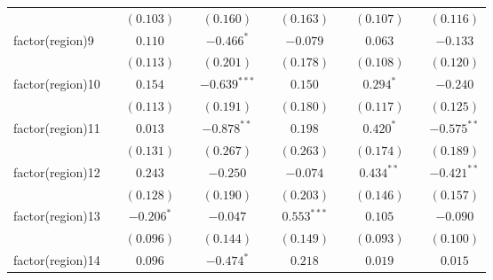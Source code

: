 \begin{tabular}{l c c c c c c c c c c}
                   &                & $(0.103)$      &                & $(0.160)$      &                & $(0.163)$      &                & $(0.107)$      &                & $(0.116)$      \\
factor(region)9    &                & $0.110$        &                & $-0.466^{*}$   &                & $-0.079$       &                & $0.063$        &                & $-0.133$       \\
                   &                & $(0.113)$      &                & $(0.201)$      &                & $(0.178)$      &                & $(0.108)$      &                & $(0.120)$      \\
factor(region)10   &                & $0.154$        &                & $-0.639^{***}$ &                & $0.150$        &                & $0.294^{*}$    &                & $-0.240$       \\
                   &                & $(0.113)$      &                & $(0.191)$      &                & $(0.180)$      &                & $(0.117)$      &                & $(0.125)$      \\
factor(region)11   &                & $0.013$        &                & $-0.878^{**}$  &                & $0.198$        &                & $0.420^{*}$    &                & $-0.575^{**}$  \\
                   &                & $(0.131)$      &                & $(0.267)$      &                & $(0.263)$      &                & $(0.174)$      &                & $(0.189)$      \\
factor(region)12   &                & $0.243$        &                & $-0.250$       &                & $-0.074$       &                & $0.434^{**}$   &                & $-0.421^{**}$  \\
                   &                & $(0.128)$      &                & $(0.190)$      &                & $(0.203)$      &                & $(0.146)$      &                & $(0.157)$      \\
factor(region)13   &                & $-0.206^{*}$   &                & $-0.047$       &                & $0.553^{***}$  &                & $0.105$        &                & $-0.090$       \\
                   &                & $(0.096)$      &                & $(0.144)$      &                & $(0.149)$      &                & $(0.093)$      &                & $(0.100)$      \\
factor(region)14   &                & $0.096$        &                & $-0.474^{*}$   &                & $0.218$        &                & $0.019$        &                & $0.015$        \\

\end{tabular}
